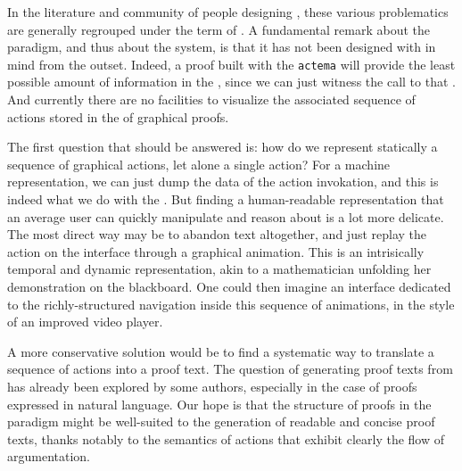 In the literature and community of people designing , these
various problematics are generally regrouped under the term of . A fundamental remark about the  paradigm, and thus about the
 system, is that it has not been designed with  in mind from the outset. Indeed, a proof built with the
\texttt{actema}  will provide the least possible amount of information in
the , since we can just witness the call to that . And
currently there are no facilities to visualize the associated sequence of
actions stored in the  of graphical proofs.

The first question that should be answered is: how do we represent statically a
sequence of graphical actions, let alone a single action? For a machine
representation, we can just dump the data of the action invokation, and this is
indeed what we do with the . But finding a human-readable
representation that an average user can quickly manipulate and reason about is a
lot more delicate. The most direct way may be to abandon text altogether, and
just replay the action on the interface through a graphical animation. This is
an intrisically temporal and dynamic representation, akin to a mathematician
unfolding her demonstration on the blackboard. One could then imagine an
interface dedicated to the richly-structured navigation inside this sequence of
animations, in the style of an improved video player.

A more conservative solution would be to find a systematic way to translate a
sequence of actions into a proof text. The question of generating
 proof texts from   has already
been explored by some authors, especially in the case of proofs expressed in
natural language. Our hope is that the structure
of proofs in the  paradigm might be well-suited to the generation of
readable and concise proof texts, thanks notably to the 
semantics of  actions that exhibit clearly the flow of argumentation.

